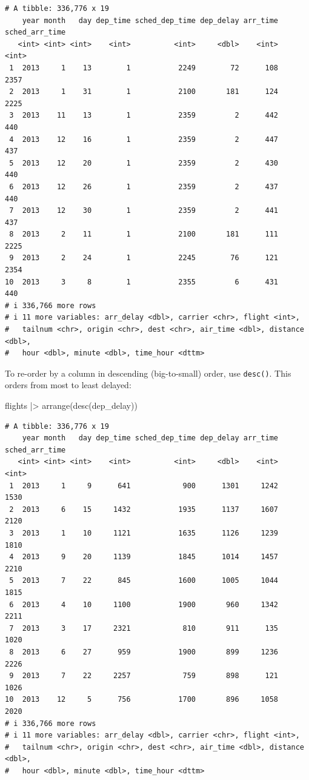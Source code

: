 \documentclass[
  letterpaper,
  DIV=11,
  numbers=noendperiod]{scrreprt}
\newenvironment{Shaded}{\begin{snugshade}}{\end{snugshade}}
\newcommand{\FunctionTok}[1]{\textcolor[rgb]{0.28,0.35,0.67}{#1}}
\newcommand{\NormalTok}[1]{\textcolor[rgb]{0.00,0.23,0.31}{#1}}
\newcommand{\SpecialCharTok}[1]{\textcolor[rgb]{0.37,0.37,0.37}{#1}}
\begin{document}
\begin{verbatim}
# A tibble: 336,776 x 19
    year month   day dep_time sched_dep_time dep_delay arr_time sched_arr_time
   <int> <int> <int>    <int>          <int>     <dbl>    <int>          <int>
 1  2013     1    13        1           2249        72      108           2357
 2  2013     1    31        1           2100       181      124           2225
 3  2013    11    13        1           2359         2      442            440
 4  2013    12    16        1           2359         2      447            437
 5  2013    12    20        1           2359         2      430            440
 6  2013    12    26        1           2359         2      437            440
 7  2013    12    30        1           2359         2      441            437
 8  2013     2    11        1           2100       181      111           2225
 9  2013     2    24        1           2245        76      121           2354
10  2013     3     8        1           2355         6      431            440
# i 336,766 more rows
# i 11 more variables: arr_delay <dbl>, carrier <chr>, flight <int>,
#   tailnum <chr>, origin <chr>, dest <chr>, air_time <dbl>, distance <dbl>,
#   hour <dbl>, minute <dbl>, time_hour <dttm>
\end{verbatim}

To re-order by a column in descending (big-to-small) order, use
\texttt{desc()}. This orders from most to least delayed:

\begin{Shaded}
\begin{Highlighting}[]
\NormalTok{flights }\SpecialCharTok{|\textgreater{}}
  \FunctionTok{arrange}\NormalTok{(}\FunctionTok{desc}\NormalTok{(dep\_delay))}
\end{Highlighting}
\end{Shaded}

\begin{verbatim}
# A tibble: 336,776 x 19
    year month   day dep_time sched_dep_time dep_delay arr_time sched_arr_time
   <int> <int> <int>    <int>          <int>     <dbl>    <int>          <int>
 1  2013     1     9      641            900      1301     1242           1530
 2  2013     6    15     1432           1935      1137     1607           2120
 3  2013     1    10     1121           1635      1126     1239           1810
 4  2013     9    20     1139           1845      1014     1457           2210
 5  2013     7    22      845           1600      1005     1044           1815
 6  2013     4    10     1100           1900       960     1342           2211
 7  2013     3    17     2321            810       911      135           1020
 8  2013     6    27      959           1900       899     1236           2226
 9  2013     7    22     2257            759       898      121           1026
10  2013    12     5      756           1700       896     1058           2020
# i 336,766 more rows
# i 11 more variables: arr_delay <dbl>, carrier <chr>, flight <int>,
#   tailnum <chr>, origin <chr>, dest <chr>, air_time <dbl>, distance <dbl>,
#   hour <dbl>, minute <dbl>, time_hour <dttm>
\end{verbatim}
\end{document}
